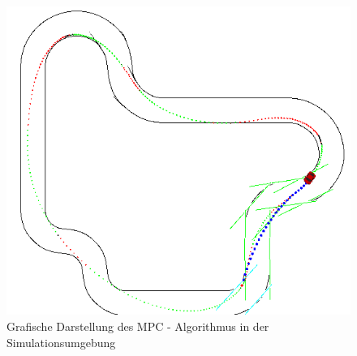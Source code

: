 \documentclass{like}
\begin{document}
\begin{figure}[ht!]
	\centering
	\includegraphics[width=350pt]{Abbildungen/sim_visual.png}
	\caption{Grafische Darstellung des MPC - Algorithmus in der Simulationsumgebung}
	\label{fig:jumpDiagram}
\end{figure}
\end{document}
